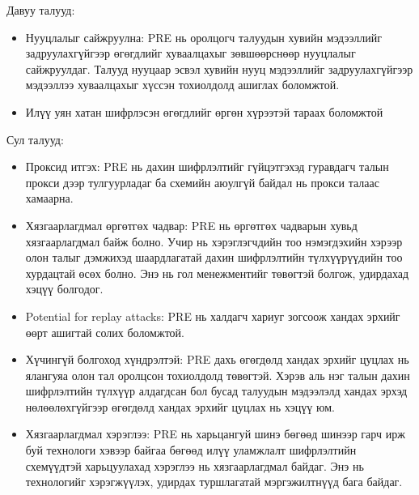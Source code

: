 Давуу талууд:
\begin{itemize}
    \item Нууцлалыг сайжруулна: PRE нь оролцогч талуудын хувийн мэдээллийг задруулахгүйгээр өгөгдлийг хуваалцахыг зөвшөөрснөөр нууцлалыг сайжруулдаг. Талууд нууцаар эсвэл хувийн нууц мэдээллийг задруулахгүйгээр мэдээллээ хуваалцахыг хүссэн тохиолдолд ашиглах боломжтой.
    \item Илүү уян хатан шифрлэсэн өгөгдлийг өргөн хүрээтэй тараах боломжтой
\end{itemize}

Сул талууд:
\begin{itemize}
    \item Проксид итгэх: PRE нь дахин шифрлэлтийг гүйцэтгэхэд гуравдагч талын прокси дээр тулгуурладаг ба схемийн аюулгүй байдал нь прокси талаас хамаарна.
    \item Хязгаарлагдмал өргөтгөх чадвар: PRE нь өргөтгөх чадварын хувьд хязгаарлагдмал байж болно. Учир нь хэрэглэгчдийн тоо нэмэгдэхийн хэрээр олон талыг дэмжихэд шаардлагатай дахин шифрлэлтийн түлхүүрүүдийн тоо хурдацтай өсөх болно. Энэ нь гол менежментийг төвөгтэй болгож, удирдахад хэцүү болгодог.
    \item Potential for replay attacks: PRE нь халдагч хариуг зогсоож хандах эрхийг өөрт ашигтай солих боломжтой. 
    \item Хүчингүй болгоход хүндрэлтэй: PRE дахь өгөгдөлд хандах эрхийг цуцлах нь ялангуяа олон тал оролцсон тохиолдолд төвөгтэй. Хэрэв аль нэг талын дахин шифрлэлтийн түлхүүр алдагдсан бол бусад талуудын мэдээлэлд хандах эрхэд нөлөөлөхгүйгээр өгөгдөлд хандах эрхийг цуцлах нь хэцүү юм.
    \item Хязгаарлагдмал хэрэглээ: PRE нь харьцангуй шинэ бөгөөд шинээр гарч ирж буй технологи хэвээр байгаа бөгөөд илүү уламжлалт шифрлэлтийн схемүүдтэй харьцуулахад хэрэглээ нь хязгаарлагдмал байдаг. Энэ нь технологийг хэрэгжүүлэх, удирдах туршлагатай мэргэжилтнүүд бага байдаг.
\end{itemize}

